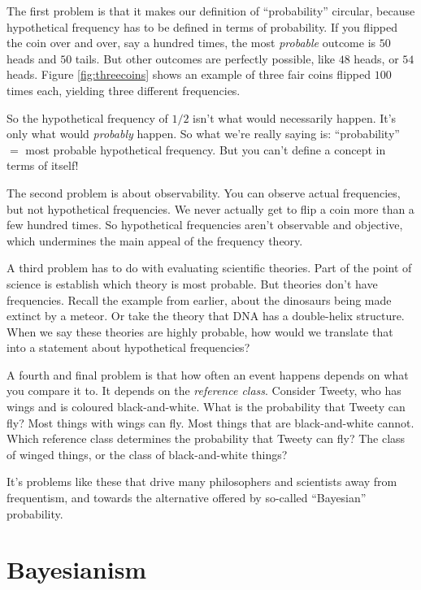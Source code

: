 \documentclass[justified]{tufte-book}
\theoremstyle{definition}
\theoremstyle{definition}
\theoremstyle{definition}
\theoremstyle{remark}
\begin{document}
The first problem is that it makes our definition of ``probability''
circular, because hypothetical frequency has to be defined in terms of
probability. If you flipped the coin over and over, say a hundred times,
the most \emph{probable} outcome is \(50\) heads and \(50\) tails. But
other outcomes are perfectly possible, like \(48\) heads, or \(54\)
heads. Figure \ref{fig:threecoins} shows an example of three fair coins
flipped \(100\) times each, yielding three different frequencies.

So the hypothetical frequency of \(1/2\) isn't what would necessarily
happen. It's only what would \emph{probably} happen. So what we're
really saying is: ``probability'' \(=\) most probable hypothetical
frequency. But you can't define a concept in terms of itself!

The second problem is about observability. You can observe actual
frequencies, but not hypothetical frequencies. We never actually get to
flip a coin more than a few hundred times. So hypothetical frequencies
aren't observable and objective, which undermines the main appeal of the
frequency theory.

A third problem has to do with evaluating scientific theories. Part of
the point of science is establish which theory is most probable. But
theories don't have frequencies. Recall the example from earlier, about
the dinosaurs being made extinct by a meteor. Or take the theory that
DNA has a double-helix structure. When we say these theories are highly
probable, how would we translate that into a statement about
hypothetical frequencies?

A fourth and final problem is that how often an event happens depends on
what you compare it to. It depends on the \emph{reference class}.
Consider Tweety, who has wings and is coloured black-and-white. What is
the probability that Tweety can fly? Most things with wings can fly.
Most things that are black-and-white cannot. Which reference class
determines the probability that Tweety can fly? The class of winged
things, or the class of black-and-white things?

It's problems like these that drive many philosophers and scientists
away from frequentism, and towards the alternative offered by so-called
``Bayesian'' probability.

\hypertarget{bayesianism}{%
\section{Bayesianism}\label{bayesianism}}
\end{document}
